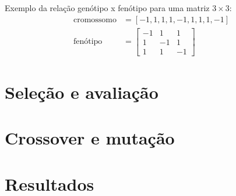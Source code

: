 Exemplo da relação genótipo x fenótipo para uma matriz \( 3 \times 3 \):
\begin{align*}
\text{cromossomo} &= \left[-1, 1, 1, 1, -1, 1, 1, 1, -1 \right]\\
\text{fenótipo} &= \begin{bmatrix}
-1 & 1 & 1 \\
1 & -1 & 1 \\
1 & 1 & -1
\end{bmatrix}
\end{align*}


\section{Seleção e avaliação}

\section{Crossover e mutação}

\section{Resultados}